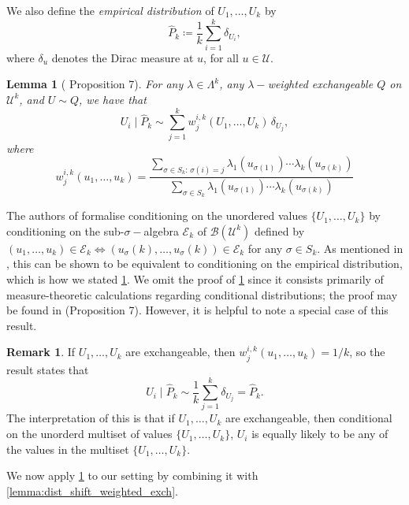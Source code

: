 \documentclass[11pt, titlepage]{article} %
\numberwithin{equation}{section}
\newtheorem{lemma}{Lemma}
\theoremstyle{definition}
\newtheorem{remark}{Remark}
\numberwithin{theorem}{section}
\numberwithin{lemma}{section}
\numberwithin{corollary}{section}
\numberwithin{proposition}{section}
\numberwithin{definition}{section}
\numberwithin{remark}{section}
\begin{document}
\noindent
We also define the \textit{empirical distribution} of \(U_1, \ldots, U_k\) by \[ \hat{P}_k \coloneqq \frac{1}{k} \sum_{i=1}^{k} \delta_{U_i}, \] where \(\delta_u\) denotes the Dirac measure at \(u\), for all \(u \in \mathcal{U}\). \vskip5pt

\noindent
\begin{lemma}[\cite{barber2024finetti} Proposition 7]
    For any \(\lambda \in \Lambda^k\), any \(\lambda-\)weighted exchangeable \(Q\) on \(\mathcal{U}^k\), and \(U \sim Q\), we have that \[U_i \mid \hat{P}_k \sim \sum_{j=1}^{k} w_{j}^{i, k}(U_1, \ldots, U_k) \, \delta_{U_j}, \] where \[w^{i, k}_j(u_1, \ldots, u_k) = \frac{ \sum_{\sigma \in S_k : \, \sigma(i) = j} \lambda_1(u_{\sigma(1)}) \cdots \lambda_k(u_{\sigma(k)})  }{\sum_{\sigma \in S_k} \lambda_1(u_{\sigma(1)}) \cdots \lambda_k(u_{\sigma(k)})}\]
\label{lemma:weighted_exch_conditional_lemma}
\end{lemma}

\noindent
The authors of \cite{barber2024finetti} formalise conditioning on the unordered values \(\{U_1, \ldots, U_k\}\) by conditioning on the sub-\(\sigma-\)algebra \(\mathcal{E}_k\) of \(\mathcal{B}(\mathcal{U}^k)\) defined by \((u_1, \ldots, u_k) \in \mathcal{E}_k \iff (u_\sigma(k), \ldots, u_\sigma(k)) \in \mathcal{E}_k\) for any \(\sigma \in S_k\). As mentioned in \cite{barber2024finetti}, this can be shown to be equivalent to conditioning on the empirical distribution, which is how we stated \cref{lemma:weighted_exch_conditional_lemma}. We omit the proof of \cref{lemma:weighted_exch_conditional_lemma} since it consists primarily of measure-theoretic calculations regarding conditional distributions; the proof may be found in \cite{barber2024finetti} (Proposition 7). However, it is helpful to note a special case of this result.
\begin{remark}
    If \(U_1, \ldots, U_k\) are exchangeable, then \(w^{i,k}_j(u_1, \ldots, u_k) = 1/k\), so the result states that \[U_i \mid \hat{P}_k \sim \frac{1}{k}\sum_{j=1}^{k} \delta_{U_j} = \hat{P}_k.\] The interpretation of this is that if \(U_1, \ldots, U_k\) are exchangeable, then conditional on the unorderd multiset of values \(\{U_1, \ldots, U_k\}\), \(U_i\) is equally likely to be any of the values in the multiset \(\{U_1, \ldots, U_k\}\).
\label{rmk:conditional_exch_dist_result}
\end{remark}

\noindent
We now apply \cref{lemma:weighted_exch_conditional_lemma} to our setting by combining it with \cref{lemma:dist_shift_weighted_exch}.
\end{document}
